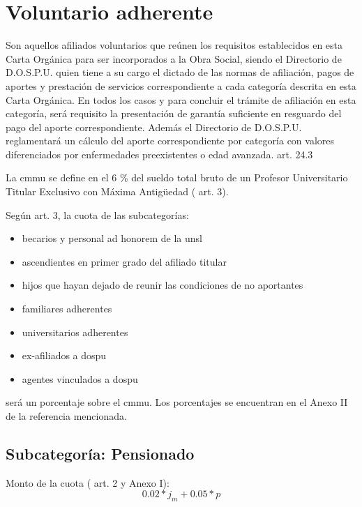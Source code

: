 \section{Voluntario adherente} \label{sec:adherente}
\begin{displayquote}
Son aquellos afiliados voluntarios que reúnen los requisitos establecidos en esta Carta Orgánica para ser incorporados a la Obra Social, siendo el Directorio de D.O.S.P.U. quien tiene a su cargo el dictado de las normas de afiliación, pagos de aportes y prestación de servicios correspondiente a cada categoría descrita en esta Carta Orgánica. En todos los casos y para concluir el trámite de afiliación en esta categoría, será requisito la presentación de garantía suficiente en resguardo del pago del aporte correspondiente. Además el Directorio de D.O.S.P.U. reglamentará un cálculo del aporte correspondiente por categoría con valores diferenciados por enfermedades preexistentes o edad avanzada.
\hfill\parencite{dospuOrd53} art. 24.3
\end{displayquote}

La \acrfull{cmmu} se define en el 6 \% del sueldo total bruto de un Profesor Universitario Titular Exclusivo con Máxima Antigüedad (\cite{dospuRes21} art. 3).

Según \cite{dospuRes21} art. 3, la cuota de las subcategorías:
\begin{itemize}
    \item becarios y personal ad honorem de la unsl
    \item ascendientes en primer grado del afiliado titular
    \item hijos que hayan dejado de reunir las condiciones de no aportantes
    \item familiares adherentes
    \item universitarios adherentes
    \item ex-afiliados a \acrshort{dospu} 
    \item agentes vinculados a \acrshort{dospu}
\end{itemize}
será un porcentaje sobre el \acrshort{cmmu}. Los porcentajes se encuentran en el Anexo II de la referencia mencionada.


\subsection{Subcategoría: Pensionado}
Monto de la cuota (\cite{dospuRes21} art. 2 y Anexo I): $$0.02 * j_m + 0.05 * p$$

